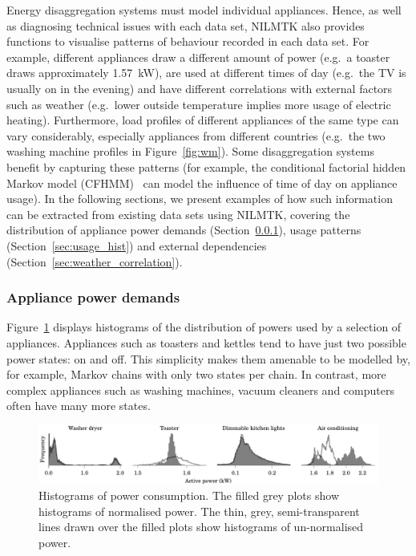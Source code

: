 \documentclass{sig-alternate}
\newcommand{\secref}[1]{Section~\ref{#1}}
\begin{document}
\noindent
Energy disaggregation systems must model individual appliances.  Hence, as well as diagnosing technical issues with each data set, NILMTK also provides functions to visualise patterns of behaviour recorded in each data set. For example, different appliances draw a different amount of power (e.g.\ a toaster draws approximately 1.57~kW), are used at different times of day (e.g.\ the TV is usually on in the evening) and have different correlations with external factors such as weather (e.g.\ lower outside temperature implies more usage of electric heating). Furthermore, load profiles of different appliances of the same type can vary considerably, especially appliances from different countries (e.g.\ the two washing machine profiles in Figure~\ref{fig:wm}). Some disaggregation systems benefit by capturing these patterns (for example, the conditional factorial hidden Markov model (CFHMM)~\cite{kim_2011} can model the influence of time of day on appliance usage). In the following sections, we present examples of how such information can be extracted from existing data sets using NILMTK, covering the distribution of appliance power demands (\secref{sec:power_hist}), usage patterns (\secref{sec:usage_hist}) and external dependencies (\secref{sec:weather_correlation}).

\subsubsection{Appliance power demands}
\label{sec:power_hist}

\noindent
Figure~\ref{fig:power_histograms} displays histograms of the
distribution of powers used by a selection of appliances.  Appliances
such as toasters and kettles tend to have just two possible power states:
on and off.  This simplicity makes them amenable to be modelled by,
for example, Markov chains with only two states per chain.  In contrast, more complex appliances
such as washing machines, vacuum cleaners and computers often
have many more states.

\begin{figure}[!t]
  \centering
  \includegraphics{figures/power_histograms.pdf} 
  \caption{Histograms of power consumption. The filled grey plots show
    histograms of normalised power.  The thin, grey,
    semi-transparent lines drawn over the filled plots show histograms
    of un-normalised power.}
  \label{fig:power_histograms} 
\end{figure}
\end{document}
